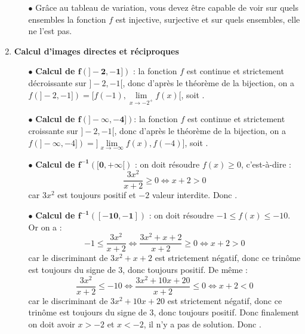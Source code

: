 \documentclass[a4paper, 11pt,reqno]{article}
\begin{document}
\begin{correction}
\begin{enumerate}
\begin{itemize}
\begin{itemize}
\begin{itemize}
						      \end{itemize}
				      \end{itemize}
			      \item[$\bullet$] Gr\^{a}ce au tableau de variation, vous devez \^{e}tre capable de voir sur quels ensembles la fonction $f$ est injective, surjective et sur quels ensembles, elle ne l'est pas.
		      \end{itemize}
		\item \textbf{Calcul d'images directes et r\'eciproques}
		      \begin{itemize}
			      \item[$\bullet$] \textbf{Calcul de $\mathbf{f(]-2,-1])}$} : la fonction $f$ est continue et strictement d\'ecroissante sur $]-2,-1[$, donc d'apr\`es le th\'eor\`eme de la bijection, on a $f(]-2,-1]) = [f(-1), \mathop{\lim}\limits_{x\rightarrow -2^+}f(x)[$, soit \fbox{$ f(]-2,-1]) = [3,+\infty[$}.
			      \item[$\bullet$] \textbf{Calcul de $\mathbf{f(]-\infty,-4])}$}: la fonction $f$ est continue et strictement croissante sur $]-2,-1[$, donc d'apr\`es le th\'eor\`eme de la bijection, on a $f(]-\infty,-4]) = ] \mathop{\lim}\limits_{x\rightarrow -\infty}f(x), f(-4)]$, soit \fbox{$ f(]-2,-1]) = ]-\infty,-24]$}.
			      \item[$\bullet$] \textbf{Calcul de $\mathbf{f^{-1}([0, +\infty[)}$} : on doit r\'esoudre $f(x) \geq 0$, c'est-\`a-dire :
				      $$ \frac{3x^2}{x+2} \geq 0 \Leftrightarrow x+2 > 0$$
				      car $3x^2$ est toujours positif et $-2$ valeur interdite. Donc \fbox{$f^{-1}([0, +\infty[) = ]-2,+\infty[$}.
			      \item[$\bullet$] \textbf{Calcul de $\mathbf{f^{-1}([-10,-1])}$} : on doit r\'esoudre $-1\leq f(x) \leq -10$. Or on a :
				      $$ -1 \leq  \frac{3x^2}{x+2} \Leftrightarrow \frac{3x^2 + x+ 2}{x+2} \geq 0 \Leftrightarrow x +2>0$$
				      car le discriminant de $3x^2 + x+ 2$ est strictement n\'egatif, donc ce trin\^ome est toujours du signe de $3$, donc toujours positif. De m\^eme :
				      $$   \frac{3x^2}{x+2} \leq -10 \Leftrightarrow \frac{3x^2 + 10x+ 20}{x+2} \leq 0 \Leftrightarrow x +2<0$$car le discriminant de $3x^2 + 10x+ 20$ est strictement n\'egatif, donc ce trin\^ome est toujours du signe de $3$, donc toujours positif. Donc finalement on doit avoir $x>-2$ et $x<-2$, il n'y a pas de solution. Donc .


\end{itemize}
\end{enumerate}
\end{correction}
\end{document}

